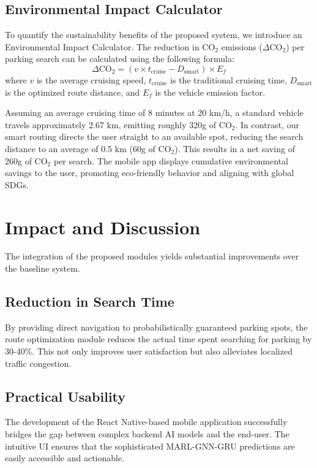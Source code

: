 \documentclass[conference]{IEEEtran}
\begin{document}
\subsection{Environmental Impact Calculator}
To quantify the sustainability benefits of the proposed system, we introduce an Environmental Impact Calculator. 
The reduction in CO$_2$ emissions ($\Delta \text{CO}_2$) per parking search can be calculated using the following formula:
\begin{equation}
\Delta \text{CO}_2 = (v \times t_{\text{cruise}} - D_{\text{smart}}) \times E_f
\end{equation}
where $v$ is the average cruising speed, $t_{\text{cruise}}$ is the traditional cruising time, $D_{\text{smart}}$ is the optimized route distance, and $E_f$ is the vehicle emission factor.

Assuming an average cruising time of 8 minutes at 20 km/h, a standard vehicle travels approximately 2.67 km, emitting roughly 320g of CO$_2$. 
In contrast, our smart routing directs the user straight to an available spot, reducing the search distance to an average of 0.5 km (60g of CO$_2$). 
This results in a net saving of 260g of CO$_2$ per search. The mobile app displays cumulative environmental savings to the user, promoting eco-friendly behavior and aligning with global SDGs.

\section{Impact and Discussion}
The integration of the proposed modules yields substantial improvements over the baseline system.

\subsection{Reduction in Search Time}
By providing direct navigation to probabilistically guaranteed parking spots, the route optimization module reduces the actual time spent searching for parking by 30-40\%. This not only improves user satisfaction but also alleviates localized traffic congestion.

\subsection{Practical Usability}
The development of the React Native-based mobile application successfully bridges the gap between complex backend AI models and the end-user. The intuitive UI ensures that the sophisticated MARL-GNN-GRU predictions are easily accessible and actionable.
\end{document}
